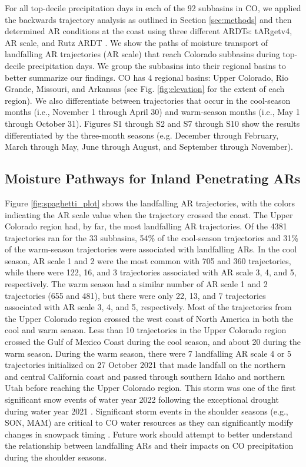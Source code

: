\documentclass[draft]{agujournal2019}
\begin{document}
For all top-decile precipitation days in each of the 92 subbasins in CO, we applied the backwards trajectory analysis as outlined in Section \ref{sec:methods} and then determined AR conditions at the coast using three different ARDTs: tARgetv4, AR scale, and Rutz ARDT \cite{Guan2024AERA5, MartinRalph2019, Rutz2014}. We show the paths of moisture transport of landfalling AR trajectories (AR scale) that reach Colorado subbasins during top-decile precipitation days. We group the subbasins into their regional basins to better summarize our findings. CO has 4 regional basins: Upper Colorado, Rio Grande, Missouri, and Arkansas (see Fig. \ref{fig:elevation} for the extent of each region). We also differentiate between trajectories that occur in the cool-season months (i.e., November 1 through April 30) and warm-season months (i.e., May 1 through October 31). Figures S1 through S2 and S7 through S10 show the results differentiated by the three-month seasons (e.g. December through February, March through May, June through August, and September through November).

\subsection{Moisture Pathways for Inland Penetrating ARs}
\label{sec:results:moisture_pathways}

Figure \ref{fig:spaghetti_plot} shows the landfalling AR trajectories, with the colors indicating the AR scale value when the trajectory crossed the coast. The Upper Colorado region had, by far, the most landfalling AR trajectories. Of the 4381 trajectories ran for the 33 subbasins, 54\% of the cool-season trajectories and 31\% of the warm-season trajectories were associated with landfalling ARs. In the cool season, AR scale 1 and 2 were the most common with 705 and 360 trajectories, while there were 122, 16, and 3 trajectories associated with AR scale 3, 4, and 5, respectively. The warm season had a similar number of AR scale 1 and 2 trajectories (655 and 481), but there were only 22, 13, and 7 trajectories associated with AR scale 3, 4, and 5, respectively. Most of the trajectories from the Upper Colorado region crossed the west coast of North America in both the cool and warm season. Less than 10 trajectories in the Upper Colorado region crossed the Gulf of Mexico Coast during the cool season, and about 20 during the warm season. During the warm season, there were 7 landfalling AR scale 4 or 5 trajectories initialized on 27 October 2021 that made landfall on the northern and central California coast and passed through southern Idaho and northern Utah before reaching the Upper Colorado region. This storm was one of the first significant snow events of water year 2022 following the exceptional drought during water year 2021 \cite{Bolinger2023ClimateEdition}. Significant storm events in the shoulder seasons (e.g., SON, MAM) are critical to CO water resources as they can significantly modify changes in snowpack timing \cite{Heldmyer2023ABasin}. Future work should attempt to better understand the relationship between landfalling ARs and their impacts on CO precipitation during the shoulder seasons.
\end{document}
